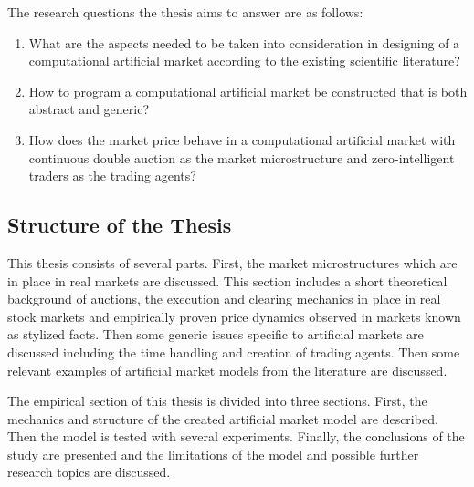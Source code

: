 The research questions the thesis aims to answer are as follows:
\begin{enumerate}
    \item What are the aspects needed to be taken into consideration in designing of a computational 
          artificial market according to the existing scientific literature?
	\item How to program a computational artificial market be constructed that is both abstract and generic?
    \item How does the market price behave in a computational artificial market with continuous
          double auction as the market microstructure and zero-intelligent traders as the 
          trading agents?
\end{enumerate}


\subsection{Structure of the Thesis}
This thesis consists of several parts. First, the market microstructures which are in place in real 
markets are discussed. This section includes a short theoretical background of auctions, the execution and clearing mechanics in place in real
stock markets and empirically proven price dynamics observed in markets known as stylized
facts. Then some generic issues specific to artificial markets are discussed including the time handling and creation
of trading agents. Then some relevant examples of artificial market models from the literature are discussed. 

The empirical section of this thesis is divided into three sections. First, the mechanics and
structure of the created artificial market model are described. Then the model is tested
with several experiments. Finally, the conclusions of the study are presented and the limitations of the model and
possible further research topics are discussed.
